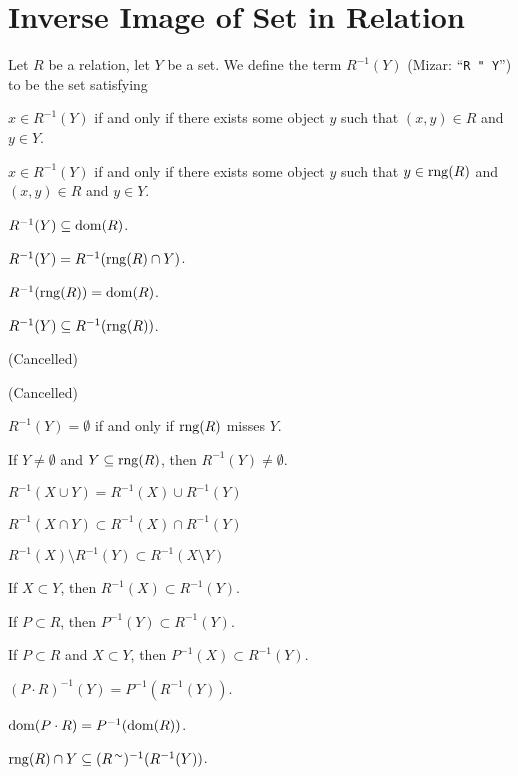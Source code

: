\documentclass{article}
\begin{document}
\section{Inverse Image of Set in Relation}

\begin{definition}%
\label{defn:relat1:preimage}%
Let $R$ be a relation, let $Y$ be a set.
We define the term $R^{-1}(Y)$ (Mizar: ``\verb#R " Y#'') to be the set satisfying
\begin{defn}
\item $x\in R^{-1}(Y)$ if and only if there exists some object $y$ such
  that $(x,y)\in R$ and $y\in Y$.
\end{defn}
\end{definition}

\begin{thm}
\item\label{relat1:131} $x\in R^{-1}(Y)$ if and only if there exists
  some object $y$ such that $y\in\operatorname{rng}(R)$ and $(x,y)\in R$ and $y\in Y$.
\item\label{relat1:132} $R^{-1}(Y)\subseteq\operatorname{dom}(R)$.
\item\label{relat1:133} $R^{-1}(Y)=R^{-1}(\operatorname{rng}(R)\cap Y)$.
\item\label{relat1:134} $R^{-1}(\operatorname{rng}(R)) = \operatorname{dom}(R)$.
\item\label{relat1:135} $R^{-1}(Y)\subseteq R^{-1}(\operatorname{rng}(R))$.
\item\label{relat1:136} (Cancelled)
\item\label{relat1:137} (Cancelled)
\item\label{relat1:138} $R^{-1}(Y)=\emptyset$ if and only if $\operatorname{rng}(R)$
  misses $Y$.
\item\label{relat1:139} If $Y\neq\emptyset$ and $Y\subseteq\operatorname{rng}(R)$,
  then $R^{-1}(Y)\neq\emptyset$.
\item\label{relat1:140} $R^{-1}(X\cup Y)=R^{-1}(X)\cup R^{-1}(Y)$
\item\label{relat1:141} $R^{-1}(X\cap Y)\subset R^{-1}(X)\cap R^{-1}(Y)$
\item\label{relat1:142} $R^{-1}(X)\setminus R^{-1}(Y)\subset R^{-1}(X\setminus Y)$
\item\label{relat1:143} If $X\subset Y$, then $R^{-1}(X)\subset R^{-1}(Y)$.
\item\label{relat1:144} If $P\subset R$, then $P^{-1}(Y)\subset R^{-1}(Y)$.
\item\label{relat1:145} If $P\subset R$ and $X\subset Y$, then
  $P^{-1}(X)\subset R^{-1}(Y)$.
\item\label{relat1:146} $(P\cdot R)^{-1}(Y)=P^{-1}(R^{-1}(Y))$.
\item\label{relat1:147} $\operatorname{dom}(P\cdot R)=P^{-1}(\operatorname{dom}(R))$.
\item\label{relat1:148} $\operatorname{rng}(R)\cap Y\subseteq (R^{\,\sim})^{-1}(R^{-1}(Y))$.
\end{thm}
\end{document}
